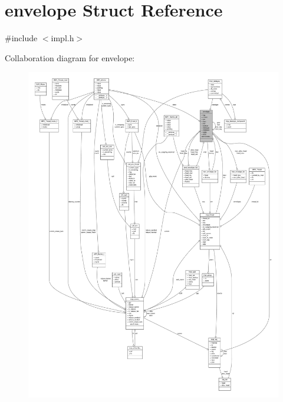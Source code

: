 \hypertarget{structenvelope}{\section{envelope \-Struct \-Reference}
\label{structenvelope}
}


{\ttfamily \#include $<$impl.\-h$>$}



\-Collaboration diagram for envelope\-:
\nopagebreak
\begin{figure}[H]
\begin{center}
\leavevmode
\includegraphics[width=350pt]{structenvelope__coll__graph}
\end{center}
\end{figure}
